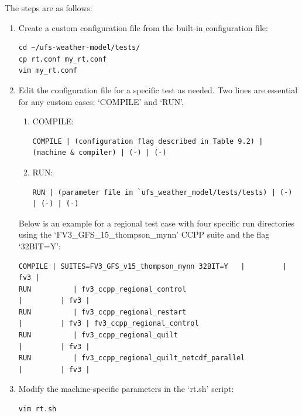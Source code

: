 \documentclass[11pt,fleqn]{report}              %
\begin{document}
The steps are as follows:
\begin{enumerate}
\item Create a custom configuration file from the built-in configuration file: 
\lstset{language=bash}   
\begin{lstlisting}[frame=trBL]
cd ~/ufs-weather-model/tests/
cp rt.conf my_rt.conf
vim my_rt.conf
\end{lstlisting}

\item Edit the configuration file for a specific test as needed. Two lines are essential for any custom cases: `COMPILE' and `RUN'.
\begin{enumerate}
\item COMPILE:
\lstset{language=bash,basicstyle=\scriptsize}   
\begin{lstlisting}[frame=trBL]
COMPILE | (configuration flag described in Table 9.2) | (machine & compiler) | (-) | (-)
\end{lstlisting}

\item RUN:
\lstset{language=bash,basicstyle=\scriptsize}   
\begin{lstlisting}[frame=trBL]
RUN | (parameter file in `ufs_weather_model/tests/tests) | (-) | (-) | (-)
\end{lstlisting}

\end{enumerate}

Below is an example for a regional test case with four specific run directories using the `FV3\_GFS\_15\_thompson\_mynn' CCPP suite and the flag `32BIT=Y':

\lstset{language=bash}   
\begin{lstlisting}[frame=trBL,basicstyle=\scriptsize]
COMPILE | SUITES=FV3_GFS_v15_thompson_mynn 32BIT=Y   |         | fv3 |
RUN          | fv3_ccpp_regional_control                                              |         | fv3 |
RUN          | fv3_ccpp_regional_restart                                               |         | fv3 | fv3_ccpp_regional_control
RUN          | fv3_ccpp_regional_quilt                                                  |         | fv3 |
RUN          | fv3_ccpp_regional_quilt_netcdf_parallel                        |         | fv3 |
\end{lstlisting}

\item Modify the machine-specific parameters in the `rt.sh' script:

\lstset{language=bash}   
\begin{lstlisting}[frame=trBL]
vim rt.sh


\end{lstlisting}
\end{enumerate}
\end{document}
